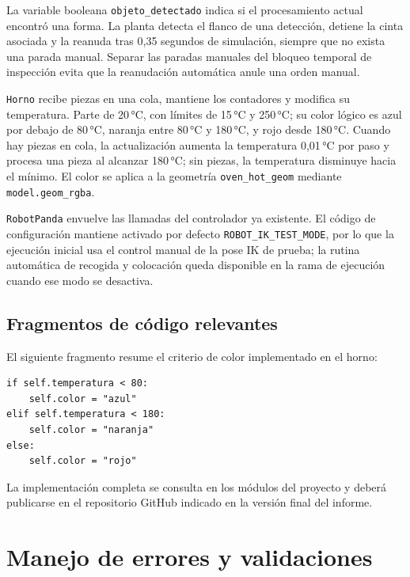 \documentclass[12pt,a4paper]{article}
\begin{document}
La variable booleana \texttt{objeto\_detectado} indica si el procesamiento
actual encontró una forma. La planta detecta el flanco de una detección,
detiene la cinta asociada y la reanuda tras 0,35 segundos de simulación,
siempre que no exista una parada manual. Separar las paradas manuales del
bloqueo temporal de inspección evita que la reanudación automática anule una
orden manual.

\texttt{Horno} recibe piezas en una cola, mantiene los contadores y modifica su
temperatura. Parte de 20\,°C, con límites de 15\,°C y 250\,°C; su color lógico
es azul por debajo de 80\,°C, naranja entre 80\,°C y 180\,°C, y rojo desde
180\,°C. Cuando hay piezas en cola, la actualización aumenta la temperatura
0,01\,°C por paso y procesa una pieza al alcanzar 180\,°C; sin piezas, la
temperatura disminuye hacia el mínimo. El color se aplica a la geometría
\texttt{oven\_hot\_geom} mediante \texttt{model.geom\_rgba}.

\texttt{RobotPanda} envuelve las llamadas del controlador ya existente. El
código de configuración mantiene activado por defecto \texttt{ROBOT\_IK\_TEST\_MODE},
por lo que la ejecución inicial usa el control manual de la pose IK de prueba;
la rutina automática de recogida y colocación queda disponible en la rama de
ejecución cuando ese modo se desactiva.

\subsection{Fragmentos de código relevantes}

El siguiente fragmento resume el criterio de color implementado en el horno:

\begin{verbatim}
if self.temperatura < 80:
    self.color = "azul"
elif self.temperatura < 180:
    self.color = "naranja"
else:
    self.color = "rojo"
\end{verbatim}

La implementación completa se consulta en los módulos del proyecto y deberá
publicarse en el repositorio GitHub indicado en la versión final del informe.


\section{Manejo de errores y validaciones}
\end{document}
